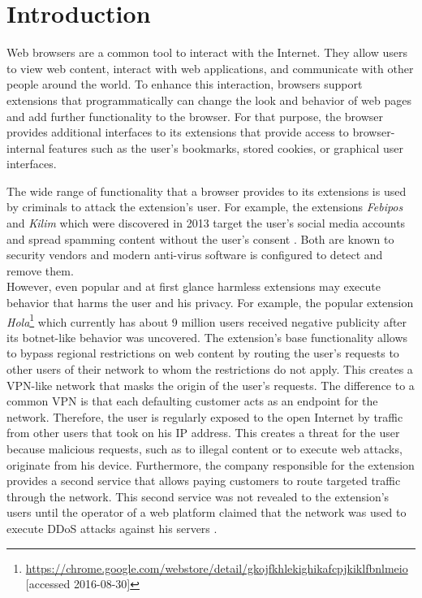 
\chapter{Introduction}

	Web browsers are a common tool to interact with the Internet. They allow users to view web content, interact with web applications, and communicate with other people around the world. To enhance this interaction, browsers support extensions that programmatically can change the look and behavior of web pages and add further functionality to the browser. For that purpose, the browser provides additional interfaces to its extensions that provide access to browser-internal features such as the user's bookmarks, stored cookies, or graphical user interfaces.
	
	The wide range of functionality that a browser provides to its extensions is used by criminals to attack the extension's user. For example, the extensions \textit{Febipos} and \textit{Kilim} which were discovered in 2013 target the user's social media accounts and spread spamming content without the user's consent \cite{febipos, kilim}. Both are known to security vendors and modern anti-virus software is configured to detect and remove them. \\
	However, even popular and at first glance harmless extensions may execute behavior that harms the user and his privacy. For example, the popular extension \textit{Hola}\footnote{\url{https://chrome.google.com/webstore/detail/gkojfkhlekighikafcpjkiklfbnlmeio} [accessed 2016-08-30]} which currently has about 9 million users received negative publicity after its botnet-like behavior was uncovered. The extension's base functionality allows to bypass regional restrictions on web content by routing the user's requests to other users of their network to whom the restrictions do not apply. This creates a VPN-like network that masks the origin of the user's requests. The difference to a common VPN is that each defaulting customer acts as an endpoint for the network. Therefore, the user is regularly exposed to the open Internet by traffic from other users that took on his IP address. This creates a threat for the user because malicious requests, such as to illegal content or to execute web attacks, originate from his device. Furthermore, the company responsible for the extension provides a second service that allows paying customers to route targeted traffic through the network. This second service was not revealed to the extension's users until the operator of a web platform claimed that the network was used to execute DDoS attacks against his servers \cite{holaFaqRewrite, 8chanHola}. 
	
